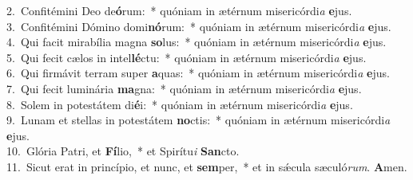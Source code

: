 {2.~}Confitémini Deo de\textbf{ó}rum:~* quóniam in ætérnum misericórdi\textit{a} \textbf{e}jus.\\
{3.~}Confitémini Dómino domi\textbf{nó}rum:~* quóniam in ætérnum misericórdi\textit{a} \textbf{e}jus.\\
{4.~}Qui facit mirabília magna \textbf{so}lus:~* quóniam in ætérnum misericórdi\textit{a} \textbf{e}jus.\\
{5.~}Qui fecit cælos in intel\textbf{lé}ctu:~* quóniam in ætérnum misericórdi\textit{a} \textbf{e}jus.\\
{6.~}Qui firmávit terram super \textbf{a}quas:~* quóniam in ætérnum misericórdi\textit{a} \textbf{e}jus.\\
{7.~}Qui fecit luminária \textbf{ma}gna:~* quóniam in ætérnum misericórdi\textit{a} \textbf{e}jus.\\
{8.~}Solem in potestátem di\textbf{é}i:~* quóniam in ætérnum misericórdi\textit{a} \textbf{e}jus.\\
{9.~}Lunam et stellas in potestátem \textbf{no}ctis:~* quóniam in ætérnum misericórdi\textit{a} \textbf{e}jus.\\
{10.~}Glória Patri, et \textbf{Fí}lio,~* et Spirítu\textit{i} \textbf{San}cto.\\
{11.~}Sicut erat in princípio, et nunc, et \textbf{sem}per,~* et in sǽcula sæculó\textit{rum}. \textbf{A}men.\\
